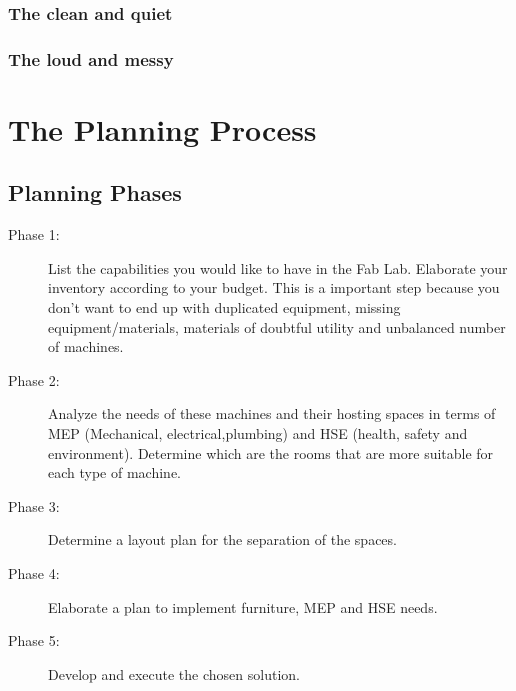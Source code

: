 \documentclass[a4paper,12pt,titlepage]{article}
\begin{document}
\subsubsection{The clean and quiet}

\subsubsection{The loud and messy} 






\clearpage 
\section{The Planning Process}
\subsection{Planning Phases}
\begin{description}
\item [Phase 1:] List the capabilities you would like to have in the Fab Lab. Elaborate your inventory according to your budget. This is a important step because you don't want to end up with duplicated equipment, missing equipment/materials, materials of doubtful utility and unbalanced number of machines.

\item [Phase 2:] Analyze the needs of these machines and their hosting spaces in terms of MEP (Mechanical, electrical,plumbing) and HSE (health, safety and environment). Determine which are the rooms that are
more suitable for each type of machine.
\item [Phase 3:] Determine a layout plan for the separation of the spaces.
\item [Phase 4:] Elaborate a plan to implement furniture, MEP and HSE needs.
\item [Phase 5:] Develop and execute the chosen solution.

\end{description}
\end{document}
